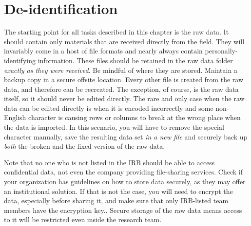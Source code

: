 
\section{De-identification}

The starting point for all tasks described in this chapter is the raw data.
It should contain only materials that are received directly from the field.
They will invariably come in a host of file formats and nearly always contain personally-identifying information.
These files should be retained in the raw data folder \textit{exactly as they were received}.
Be mindful of where they are stored. 
Maintain a backup copy in a secure offsite location.
Every other file is created from the raw data, and therefore can be recreated.
The exception, of course, is the raw data itself, so it should never be edited directly.
The rare and only case when the raw data can be edited directly is when it is encoded incorrectly
and some non-English character is causing rows or columns to break at the wrong place
when the data is imported. 
In this scenario, you will have to remove the special character manually, save the resulting data set \textit{in a new file} and securely back up \textit{both} the broken and the fixed version of the raw data.

Note that no one who is not listed in the IRB should be able to access confidential data, 
not even the company providing file-sharing services.
Check if your organization has guidelines on how to store data securely, as they may offer an institutional solution. 
If that is not the case, you will need to encrypt the data, especially before
sharing it, and make sure that only IRB-listed team members have the
encryption key..
Secure storage of the raw data means access to it will be restricted even inside the research team.


